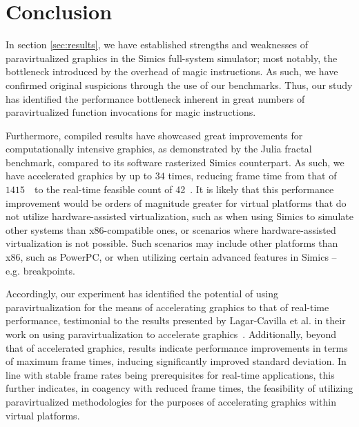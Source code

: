 
\section{Conclusion}
\label{sec:conclusion}
In section \ref{sec:results}, we have established strengths and weaknesses of paravirtualized graphics in the Simics full-system simulator; most notably, the bottleneck introduced by the overhead of magic instructions.
As such, we have confirmed original suspicions through the use of our benchmarks.
Thus, our study has identified the performance bottleneck inherent in great numbers of paravirtualized function invocations for magic instructions.

Furthermore, compiled results have showcased great improvements for computationally intensive graphics, as demonstrated by the Julia fractal benchmark, compared to its software rasterized Simics counterpart.
As such, we have accelerated graphics by up to $34$ times, reducing frame time from that of $1415$~\milli\second\ to the real-time feasible count of 42~\milli\second .
It is likely that this performance improvement would be orders of magnitude greater for virtual platforms that do not utilize hardware-assisted virtualization, such as when using Simics to simulate other systems than x86-compatible ones, or scenarios where hardware-assisted virtualization is not possible.
Such scenarios may include other platforms than x86, such as PowerPC, or when utilizing certain advanced features in Simics -- e.g. breakpoints.

Accordingly, our experiment has identified the potential of using paravirtualization for the means of accelerating graphics to that of real-time performance, testimonial to the results presented by Lagar-Cavilla et al. in their work on using paravirtualization to accelerate graphics~.
Additionally, beyond that of accelerated graphics, results indicate performance improvements in terms of maximum frame times, inducing significantly improved standard deviation.
In line with stable frame rates being prerequisites for real-time applications, this further indicates, in coagency with reduced frame times, the feasibility of utilizing paravirtualized methodologies for the purposes of accelerating graphics within virtual platforms.

